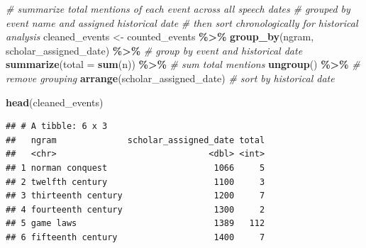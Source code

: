 \documentclass[
]{article}
\newenvironment{Shaded}{\begin{snugshade}}{\end{snugshade}}
\newcommand{\AttributeTok}[1]{\textcolor[rgb]{0.13,0.29,0.53}{#1}}
\newcommand{\CommentTok}[1]{\textcolor[rgb]{0.56,0.35,0.01}{\textit{#1}}}
\newcommand{\FunctionTok}[1]{\textcolor[rgb]{0.13,0.29,0.53}{\textbf{#1}}}
\newcommand{\NormalTok}[1]{#1}
\newcommand{\OtherTok}[1]{\textcolor[rgb]{0.56,0.35,0.01}{#1}}
\newcommand{\SpecialCharTok}[1]{\textcolor[rgb]{0.81,0.36,0.00}{\textbf{#1}}}
\begin{document}
\begin{Shaded}
\begin{Highlighting}[]
\CommentTok{\# summarize total mentions of each event across all speech dates}
\CommentTok{\# grouped by event name and assigned historical date}
\CommentTok{\# then sort chronologically for historical analysis}
\NormalTok{cleaned\_events }\OtherTok{\textless{}{-}}\NormalTok{ counted\_events }\SpecialCharTok{\%\textgreater{}\%}
  \FunctionTok{group\_by}\NormalTok{(ngram, scholar\_assigned\_date) }\SpecialCharTok{\%\textgreater{}\%} \CommentTok{\# group by event and historical date}
  \FunctionTok{summarize}\NormalTok{(}\AttributeTok{total =} \FunctionTok{sum}\NormalTok{(n)) }\SpecialCharTok{\%\textgreater{}\%} \CommentTok{\# sum total mentions}
  \FunctionTok{ungroup}\NormalTok{() }\SpecialCharTok{\%\textgreater{}\%} \CommentTok{\# remove grouping}
  \FunctionTok{arrange}\NormalTok{(scholar\_assigned\_date) }\CommentTok{\# sort by historical date}

\FunctionTok{head}\NormalTok{(cleaned\_events)}
\end{Highlighting}
\end{Shaded}

\begin{verbatim}
## # A tibble: 6 x 3
##   ngram              scholar_assigned_date total
##   <chr>                              <dbl> <int>
## 1 norman conquest                     1066     5
## 2 twelfth century                     1100     3
## 3 thirteenth century                  1200     7
## 4 fourteenth century                  1300     2
## 5 game laws                           1389   112
## 6 fifteenth century                   1400     7
\end{verbatim}
\end{document}
